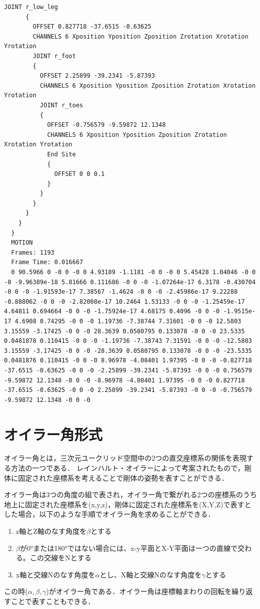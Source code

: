 \documentclass[a4j, fleqn, 12pt]{jsreport}
\begin{document}
\begin{lstlisting}[caption=mocopiのBVHファイル,label=BVH]
      JOINT r_low_leg
      {
        OFFSET 0.827718 -37.6515 -0.63625
        CHANNELS 6 Xposition Yposition Zposition Zrotation Xrotation Yrotation
        JOINT r_foot
        {
          OFFSET 2.25899 -39.2341 -5.87393
          CHANNELS 6 Xposition Yposition Zposition Zrotation Xrotation Yrotation
          JOINT r_toes
          {
            OFFSET -0.756579 -9.59872 12.1348
            CHANNELS 6 Xposition Yposition Zposition Zrotation Xrotation Yrotation
            End Site
            {
              OFFSET 0 0 0.1
            }
          }
        }
      }
    }
  }
  MOTION
  Frames: 1193
  Frame Time: 0.016667
  0 90.5966 0 -0 0 -0 0 4.93189 -1.1181 -0 0 -0 0 5.45428 1.04046 -0 0 -0 -9.96389e-18 5.81666 0.111686 -0 0 -0 -1.07264e-17 6.3178 -0.430704 -0 0 -0 -1.91593e-17 7.38567 -1.4624 -0 0 -0 -2.45986e-17 9.22288 -0.888062 -0 0 -0 -2.82008e-17 10.2464 1.53133 -0 0 -0 -1.25459e-17 4.64811 0.694664 -0 0 -0 -1.75924e-17 4.68175 0.4096 -0 0 -0 -1.9515e-17 4.6908 0.74295 -0 0 -0 1.19736 -7.38744 7.31601 -0 0 -0 12.5803 3.15559 -3.17425 -0 0 -0 28.3639 0.0580795 0.133078 -0 0 -0 23.5335 0.0481878 0.110415 -0 0 -0 -1.19736 -7.38743 7.31591 -0 0 -0 -12.5803 3.15559 -3.17425 -0 0 -0 -28.3639 0.0580795 0.133078 -0 0 -0 -23.5335 0.0481876 0.110415 -0 0 -0 8.96978 -4.08401 1.97395 -0 0 -0 -0.827718 -37.6515 -0.63625 -0 0 -0 -2.25899 -39.2341 -5.87393 -0 0 -0 0.756579 -9.59872 12.1348 -0 0 -0 -8.96978 -4.08401 1.97395 -0 0 -0 0.827718 -37.6515 -0.63625 -0 0 -0 2.25899 -39.2341 -5.87393 -0 0 -0 -0.756579 -9.59872 12.1348 -0 0 -0   
\end{lstlisting}
\chapter{オイラー角形式}\label{Euler}
オイラー角\cite{オイラー}とは，三次元ユークリッド空間中の2つの直交座標系の関係を表現する方法の一つである．
レインハルト・オイラーによって考案されたもので，剛体に固定された座標系を考えることで剛体の姿勢を表すことができる．

オイラー角は3つの角度の組で表され，オイラー角で繋がれる2つの座標系のうち地上に固定された座標系を(x,y,z)，剛体に固定された座標系を(X,Y,Z)で表すとした場合，以下のような手順でオイラー角を求めることができる．
\begin{enumerate}
  \item z軸とZ軸のなす角度を$\beta$とする
  \item $\beta$が0°または180°ではない場合には、x-y平面とX-Y平面は一つの直線で交わる。この交線をNとする
  \item x軸と交線Nのなす角度を$\alpha$とし、X軸と交線Nのなす角度を$\gamma$とする
\end{enumerate}
この時($\alpha,\beta,\gamma$)がオイラー角である．オイラー角は座標軸まわりの回転を繰り返すことで表すこともできる．
\end{document}

